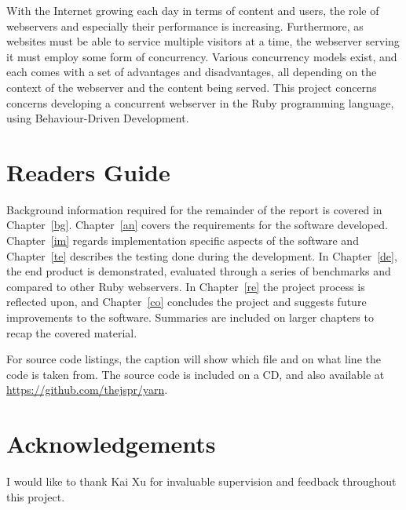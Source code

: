 %
With the Internet growing each day in terms of content and users, the role of
webservers and especially their performance is increasing. Furthermore, as
websites must be able to service multiple visitors at a time, the webserver
serving it must employ some form of concurrency. Various concurrency models
exist, and each comes with a set of advantages and disadvantages, all
depending on the context of the webserver and the content being served. This
project concerns concerns developing a concurrent webserver in the Ruby
programming language, using Behaviour-Driven Development.

\section{Readers Guide}
Background information required for the remainder of the report is covered in
Chapter~\ref{bg}. Chapter~\ref{an} covers the requirements for the software
developed. Chapter~\ref{im} regards implementation specific aspects of the
software and Chapter~\ref{te} describes the testing done during the
development. In Chapter~\ref{de}, the end product is demonstrated,
evaluated through a series of benchmarks and compared to other Ruby
webservers. In Chapter~\ref{re} the project process is reflected upon, and
Chapter~\ref{co} concludes the project and suggests future improvements to the
software. Summaries are included on larger chapters to recap the covered
material.

For source code listings, the caption will show which file and on what line
the code is taken from. The source code is included on a CD, and also
available at \url{https://github.com/thejspr/yarn}.

\section{Acknowledgements}
I would like to thank Kai Xu for invaluable supervision and feedback
throughout this project.
